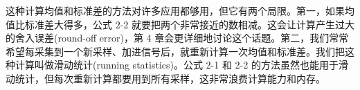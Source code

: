 \begin{Shaded}
\begin{Highlighting}[]
    \OperatorTok{=} \OperatorTok{;}
     \OperatorTok{(}\OperatorTok{=} \OperatorTok{;}\OperatorTok{\textless{}}\OperatorTok{;}\OperatorTok{++)} \OperatorTok{\{}
\OperatorTok{=}\OperatorTok{+}\OperatorTok{[}\OperatorTok{];}
    \OperatorTok{\}}
\OperatorTok{=}\OperatorTok{/}\OperatorTok{;}

    \OperatorTok{=} \OperatorTok{;}
     \OperatorTok{(}\OperatorTok{=} \OperatorTok{;}\OperatorTok{\textless{}}\OperatorTok{;}\OperatorTok{++)} \OperatorTok{\{}
        \OperatorTok{=}\OperatorTok{[}\OperatorTok{]} \OperatorTok{{-}}\OperatorTok{;}
\OperatorTok{=}\OperatorTok{+}\OperatorTok{*}\OperatorTok{;}
    \OperatorTok{\}}
\OperatorTok{=}\OperatorTok{/} \OperatorTok{(}\OperatorTok{{-}} \OperatorTok{);}
    \OperatorTok{=}\OperatorTok{(}\OperatorTok{);}

\OperatorTok{(}\OperatorTok{,}\OperatorTok{,}\OperatorTok{);}
     \OperatorTok{;}
\OperatorTok{\}}
\end{Highlighting}
\end{Shaded}

这种计算均值和标准差的方法对许多应用都够用，但它有两个局限。第一，如果均值比标准差大得多，公式
2-2 就要把两个非常接近的数相减。这会让计算产生过大的舍入误差(round-off
error)，第 4
章会更详细地讨论这个话题。第二，我们常常希望每采集到一个新采样、加进信号后，就重新计算一次均值和标准差。我们把这种计算叫做滑动统计(running
statistics)。公式 2-1 和 2-2
的方法虽然也能用于滑动统计，但每次重新计算都要用到所有采样，这非常浪费计算能力和内存。

